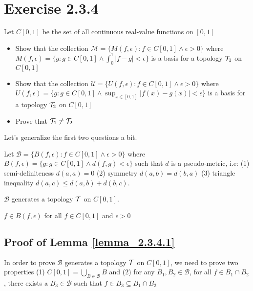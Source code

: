 \documentclass{article}
\begin{document}
\section*{Exercise 2.3.4}

Let $C[0, 1]$ be the set of all continuous real-value functions on $[0, 1]$

\begin{itemize}
    \item Show that the collection $\mathcal{M} = \{ M(f, \epsilon): f \in C[0, 1] \land \epsilon > 0\}$ where $M(f, \epsilon) = \{g: g \in C[0, 1] \land \int_0^1 |f - g| < \epsilon \}$ is a basis for a topology $\mathcal{T}_1$ on $C[0, 1]$
    \item Show that the collection $\mathcal{U} = \{ U(f, \epsilon): f \in C[0, 1] \land \epsilon > 0\}$ where $U(f, \epsilon) = \{g: g \in C[0, 1] \land \sup_{x \in [0, 1]} |f(x) - g(x)| < \epsilon \}$ is a basis for a topology $\mathcal{T}_2$ on $C[0, 1]$
    \item Prove that $\mathcal{T}_1 \neq \mathcal{T}_2$
\end{itemize}

Let's generalize the first two questions a bit.
\\

\begin{lemma}
\label{lemma_2.3.4.1}

Let $\mathcal{B} = \{ B(f, \epsilon): f \in C[0, 1] \land \epsilon > 0\}$ where $B(f, \epsilon) = \{g: g \in C[0, 1] \land d(f, g) < \epsilon \}$ such that $d$ is a pseudo-metric, i.e: (1) semi-definiteness $d(a, a) = 0$ (2) symmetry $d(a, b) = d(b, a)$ (3) triangle inequality $d(a, c) \leq d(a, b) + d(b, c)$.

$\mathcal{B}$ generates a topology $\mathcal{T}$ on $C[0, 1]$.
\end{lemma}

\begin{remark}
$f \in B(f, \epsilon)$ for all $f \in C[0, 1]$ and $\epsilon > 0$
\end{remark}

\subsection*{Proof of Lemma \ref{lemma_2.3.4.1}}

In order to prove $\mathcal{B}$ generates a topology $\mathcal{T}$ on $C[0, 1]$, we need to prove two properties (1) $C[0, 1] = \bigcup_{B \in \mathcal{B}} B$ and (2) for any $B_1, B_2 \in \mathcal{B}$, for all $f \in B_1 \cap B_2$, there exists a $B_3 \in \mathcal{B}$ such that $f \in B_3 \subseteq B_1 \cap B_2$
\end{document}

